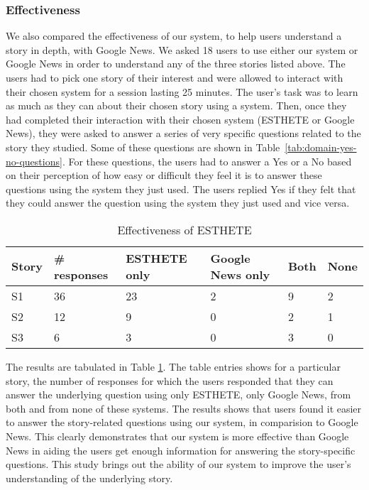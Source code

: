 \subsubsection*{Effectiveness}
We also compared the effectiveness of our system, to help users understand a story in depth, with Google News. We asked 18 users to use either our system or Google News in order to understand any of the three stories listed above. The users had to pick one story of their interest and were allowed to interact with their chosen system for a session lasting 25 minutes. The user's task was to learn as much as they can about their chosen story using a system. Then, once they had completed their
interaction with their chosen system (ESTHETE or Google News), they were asked to answer a series of very specific questions related to the story they studied. Some of these questions are shown in Table~\ref{tab:domain-yes-no-questions}. For these questions, the users had to answer a Yes or a No based on their perception of how easy or difficult they feel it is to answer these questions using the system they just used. The users replied Yes if they felt that they could answer the question using the system they just used and vice versa.

\begin{table}
\small
\begin{center}
\begin{tabular}{|l|p{1.00cm}|p{1.45cm}|p{1.00cm}|p{1.00cm}|p{1.00cm}|}
\hline
{\bf Story} & {\bf \# responses} & {\bf ESTHETE only} & {\bf Google News only} & {\bf Both} &{\bf None}\\
\hline
S1 & 36 & 23 & 2 & 9 & 2\\
S2 & 12 & 9 & 0 & 2 & 1\\
S3 & 6 & 3 & 0 & 3 & 0 \\
\hline
\end{tabular}
\end{center}
\caption{Effectiveness of ESTHETE}
\label{tab:effectiveness}
\end{table}
\normalsize
The results are tabulated in Table \ref{tab:effectiveness}. The table entries shows for a particular story, the number of responses for which the users responded that they can answer the underlying question using only ESTHETE, only Google News, from both and from none of these systems. The results shows that users found it easier to answer the story-related questions using our system, in comparision to Google News. This clearly demonstrates that our system is more effective than Google News in aiding the users get enough information for answering the story-specific questions. This study brings out the ability of our system to improve the user's understanding of the underlying story.  

